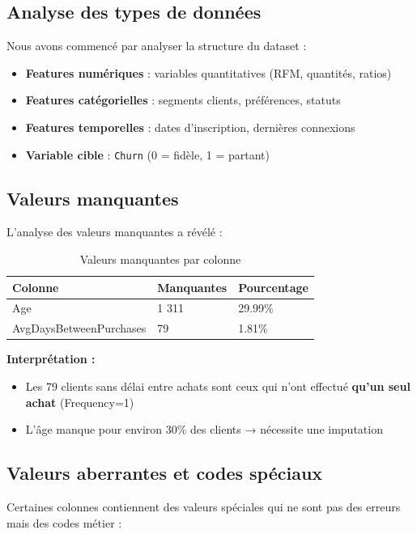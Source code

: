 \documentclass[11pt,a4paper]{article}
\begin{document}
\subsection{Analyse des types de données}
Nous avons commencé par analyser la structure du dataset :
\begin{itemize}
    \item \textbf{Features numériques} : variables quantitatives (RFM, quantités, ratios)
    \item \textbf{Features catégorielles} : segments clients, préférences, statuts
    \item \textbf{Features temporelles} : dates d'inscription, dernières connexions
    \item \textbf{Variable cible} : \texttt{Churn} (0 = fidèle, 1 = partant)
\end{itemize}

\subsection{Valeurs manquantes}
L'analyse des valeurs manquantes a révélé :

\begin{table}[H]
\centering
\begin{tabular}{L{5cm} C{2.5cm} C{2.5cm}}
\toprule
\textbf{Colonne} & \textbf{Manquantes} & \textbf{Pourcentage} \\
\midrule
Age & 1 311 & 29.99\% \\
AvgDaysBetweenPurchases & 79 & 1.81\% \\
\bottomrule
\end{tabular}
\caption{Valeurs manquantes par colonne}
\end{table}

\textbf{Interprétation :}
\begin{itemize}
    \item Les 79 clients sans délai entre achats sont ceux qui n'ont effectué \textbf{qu'un seul achat} (Frequency=1)
    \item L'âge manque pour environ 30\% des clients → nécessite une imputation
\end{itemize}

\subsection{Valeurs aberrantes et codes spéciaux}
Certaines colonnes contiennent des valeurs spéciales qui ne sont pas des erreurs mais 
des codes métier :
\end{document}
